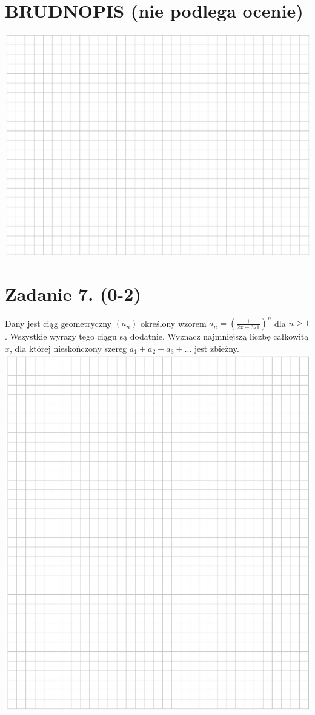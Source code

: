 \documentclass[10pt]{article}
\begin{document}
\section*{BRUDNOPIS (nie podlega ocenie)}
\begin{center}
\includegraphics[max width=\textwidth]{2024_11_21_054c332d5c02f869c372g-04(1)}
\end{center}

\section*{Zadanie 7. (0-2)}
Dany jest ciąg geometryczny \(\left(a_{n}\right)\) określony wzorem \(a_{n}=\left(\frac{1}{2 x-371}\right)^{n}\) dla \(n \geq 1\). Wszystkie wyrazy tego ciągu są dodatnie. Wyznacz najmniejszą liczbę całkowitą \(x\), dla której nieskończony szereg \(a_{1}+a_{2}+a_{3}+\ldots\) jest zbieżny.\\
\includegraphics[max width=\textwidth, center]{2024_11_21_054c332d5c02f869c372g-05}
\end{document}
